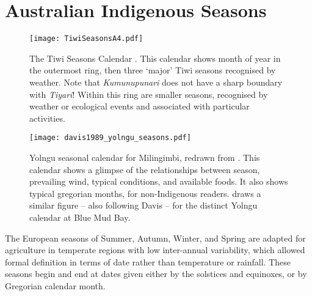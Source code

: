 \section{Australian Indigenous Seasons}
\label{sec:aus-indig-seasons}

\begin{sidewaysfigure}
    \vspace{0.3in}
    \centerline{ \texttt{[image: TiwiSeasonsA4.pdf]} }
    \caption[The Tiwi Seasons Calendar \citep{CSIROcals}]{
        The Tiwi Seasons Calendar \citep{CSIROcals}.
        This calendar shows month of year in the outermost ring,
        then three `major' Tiwi seasons recognised by weather.
        Note that \textit{Kumunupunari} does not have a sharp boundary with \textit{Tiyari}!
        Within this ring are smaller seasons, recognised by weather
        or ecological events and associated with particular activities.
        }
    \label{fig:tiwi-seasons}
\end{sidewaysfigure}

\begin{SCfigure}[][bth]
    \centering
    \texttt{[image: davis1989\_yolngu\_seasons.pdf]}
    \caption[Yolngu seasonal calendar for Milingimbi \citep{davis1989}]{
        Yolngu seasonal calendar for Milingimbi, redrawn from \citet[p2]{davis1989}.
        This calendar shows a glimpse of the relationships between season,
        prevailing wind, typical conditions, and available foods.
        It also shows typical gregorian months, for non-Indigenous readers.
        \citet[][p.107]{barber2005} draws a similar figure -- also following
        Davis -- for the distinct Yolngu calendar at Blue Mud Bay.
        }
    \label{fig:yolngu-seasons}
\end{SCfigure}


The European seasons of Summer, Autumn, Winter, and Spring are adapted for
agriculture in temperate regions with low inter-annual variability, which
allowed formal definition in terms of date rather than temperature or rainfall.
These seasons begin and end at dates given either by the solstices and equinoxes,
or by Gregorian calendar month.


